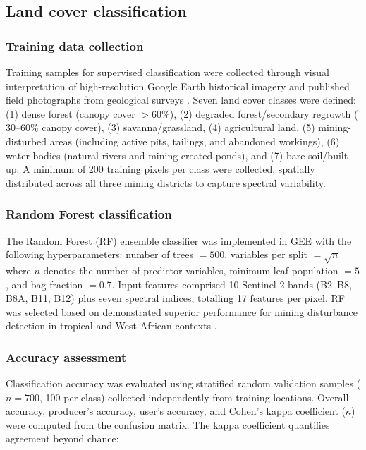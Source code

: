 \documentclass[preprint,12pt,number]{elsarticle}
\begin{document}
\subsection{Land cover classification}

\subsubsection{Training data collection}

Training samples for supervised classification were collected through visual interpretation of high-resolution Google Earth historical imagery and published field photographs from geological surveys \cite{Kamga2020, Mimba2018}. Seven land cover classes were defined: (1) dense forest (canopy cover $> 60\%$), (2) degraded forest/secondary regrowth ($30$--$60\%$ canopy cover), (3) savanna/grassland, (4) agricultural land, (5) mining-disturbed areas (including active pits, tailings, and abandoned workings), (6) water bodies (natural rivers and mining-created ponds), and (7) bare soil/built-up. A minimum of 200 training pixels per class were collected, spatially distributed across all three mining districts to capture spectral variability.

\subsubsection{Random Forest classification}

The Random Forest (RF) ensemble classifier was implemented in GEE with the following hyperparameters: number of trees $= 500$, variables per split $= \sqrt{n}$ where $n$ denotes the number of predictor variables, minimum leaf population $= 5$, and bag fraction $= 0.7$. Input features comprised 10 Sentinel-2 bands (B2--B8, B8A, B11, B12) plus seven spectral indices, totalling 17 features per pixel. RF was selected based on demonstrated superior performance for mining disturbance detection in tropical and West African contexts \cite{Ngom2020, Duan2022}.

\subsubsection{Accuracy assessment}

Classification accuracy was evaluated using stratified random validation samples ($n = 700$, 100 per class) collected independently from training locations. Overall accuracy, producer's accuracy, user's accuracy, and Cohen's kappa coefficient ($\kappa$) were computed from the confusion matrix. The kappa coefficient quantifies agreement beyond chance:
\end{document}
